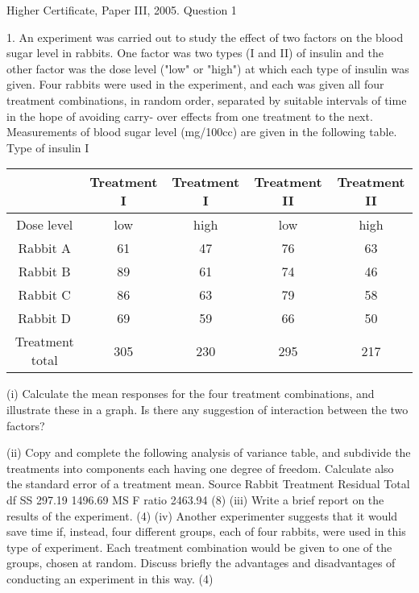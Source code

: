 \documentclass[a4paper,12pt]{article}
\begin{document}
Higher Certificate, Paper III, 2005. Question 1
\begin{framed}
1.
An experiment was carried out to study the effect of two factors on the blood sugar
level in rabbits. One factor was two types (I and II) of insulin and the other factor was
the dose level ("low" or "high") at which each type of insulin was given. Four rabbits
were used in the experiment, and each was given all four treatment combinations, in
random order, separated by suitable intervals of time in the hope of avoiding carry-
over effects from one treatment to the next.
Measurements of blood sugar level (mg/100cc) are given in the following table.
Type of insulin
I

\begin{center}

\begin{tabular}{ccccc}
	&	Treatment I	&	Treatment I	&	Treatment II	&	Treatment II	\\ \hline 
Dose level	&	low	&	high	&	low	&	high	\\ \hline 
Rabbit A	&	61	&	47	&	76	&	63	\\ \hline 
Rabbit B	&	89	&	61	&	74	&	46	\\ \hline 
Rabbit C	&	86	&	63	&	79	&	58	\\ \hline 
Rabbit D	&	69	&	59	&	66	&	50	\\ \hline 
Treatment total	&	305	&	230	&	295	&	217	\\ \hline 
\end{tabular}
\end{center}
(i) Calculate the mean responses for the four treatment combinations, and
illustrate these in a graph. Is there any suggestion of interaction between the
two factors?
\end{framed}
\begin{framed}
(ii) Copy and complete the following analysis of variance table, and subdivide the
treatments into components each having one degree of freedom. Calculate also
the standard error of a treatment mean.
Source
Rabbit
Treatment
Residual
Total
df
SS
297.19
1496.69
MS
F ratio
2463.94
(8)
(iii)
Write a brief report on the results of the experiment.
(4)
(iv)
Another experimenter suggests that it would save time if, instead, four
different groups, each of four rabbits, were used in this type of experiment.
Each treatment combination would be given to one of the groups, chosen at
random. Discuss briefly the advantages and disadvantages of conducting an
experiment in this way.
(4)

\end{framed}
\end{document}

